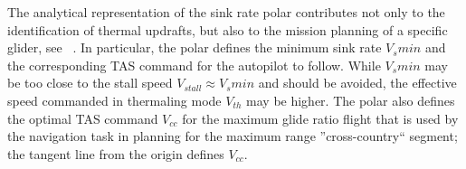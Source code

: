 \documentclass{ifacconf}
\begin{document}
The analytical representation of the sink rate polar contributes not only to the
identification of thermal updrafts, but also to the mission planning of a
specific glider, see ~\cite{FAA:2011}. In particular,
the polar defines the minimum sink rate $V_{s}min$ and the corresponding TAS
command for the autopilot to follow. While $V_{s}min$ may be too close to the
stall speed $V_{stall} \approx V_{s}min$ and should be avoided, the effective
speed commanded in thermaling mode $V_{th}$ may be higher. The polar
also defines the optimal TAS command $V_{cc}$ for the maximum glide ratio
flight that is used by the navigation task in planning for the maximum range
''cross-country`` segment; the tangent line from the origin defines $V_{cc}$.
\end{document}
